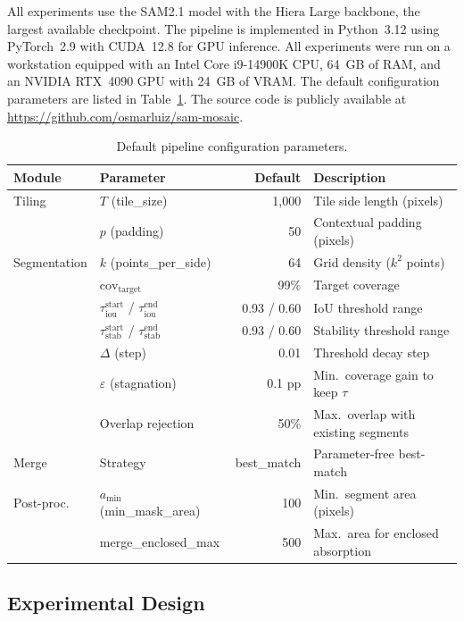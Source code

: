 \documentclass[review,11pt,authoryear]{elsarticle}
\begin{document}
All experiments use the SAM2.1 model with the Hiera Large backbone, the largest available checkpoint. The pipeline is implemented in Python~3.12 using PyTorch~2.9 with CUDA~12.8 for GPU inference. All experiments were run on a workstation equipped with an Intel Core i9-14900K CPU, 64~GB of RAM, and an NVIDIA RTX~4090 GPU with 24~GB of VRAM. The default configuration parameters are listed in Table~\ref{tab:default_config}. The source code is publicly available at \url{https://github.com/osmarluiz/sam-mosaic}.

\begin{table}[htbp]
\centering
\caption{Default pipeline configuration parameters.}
\label{tab:default_config}
\scriptsize
\begin{tabular*}{\textwidth}{@{\extracolsep{\fill}}llrl}
\toprule
Module & Parameter & Default & Description \\
\midrule
Tiling & $T$ (tile\_size) & 1{,}000 & Tile side length (pixels) \\
       & $p$ (padding) & 50 & Contextual padding (pixels) \\
\midrule
Segmentation & $k$ (points\_per\_side) & 64 & Grid density ($k^2$ points) \\
             & $\text{cov}_{\text{target}}$ & 99\% & Target coverage \\
             & $\tau_{\text{iou}}^{\text{start}}$ / $\tau_{\text{iou}}^{\text{end}}$ & 0.93 / 0.60 & IoU threshold range \\
             & $\tau_{\text{stab}}^{\text{start}}$ / $\tau_{\text{stab}}^{\text{end}}$ & 0.93 / 0.60 & Stability threshold range \\
             & $\Delta$ (step) & 0.01 & Threshold decay step \\
             & $\varepsilon$ (stagnation) & 0.1 pp & Min.\ coverage gain to keep $\tau$ \\
             & Overlap rejection & 50\% & Max.\ overlap with existing segments \\
\midrule
Merge & Strategy & best\_match & Parameter-free best-match \\
\midrule
Post-proc. & $a_{\min}$ (min\_mask\_area) & 100 & Min.\ segment area (pixels) \\
           & merge\_enclosed\_max & 500 & Max.\ area for enclosed absorption \\
\bottomrule
\end{tabular*}
\end{table}

\subsection{Experimental Design}
\label{sec:exp_design}
\end{document}
